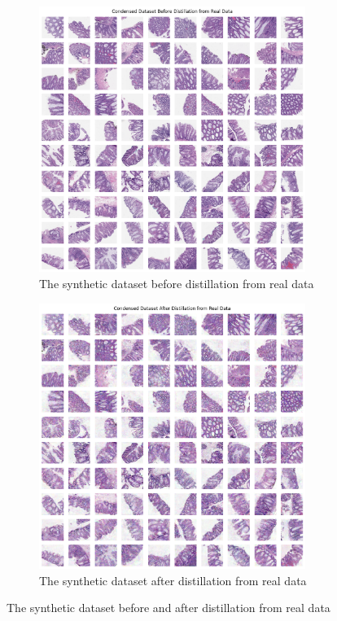 \documentclass[onecolumn]{IEEEtran}
\begin{document}
\begin{figure}[H]
    \centering
    \begin{subfigure}{.5\textwidth}
        \centering
        \includegraphics[width=0.95\textwidth]{images/MHIST_datadam_before_distil_real.png}
        \caption{The synthetic dataset before distillation from real data}
        \label{fig:MHIST_datadam_before_distil_real}
    \end{subfigure}%
    \begin{subfigure}{.5\textwidth}
        \centering
        \includegraphics[width=0.95\textwidth]{images/MHIST_datadam_after_distil_real.png}
        \caption{The synthetic dataset after distillation from real data}
        \label{fig:MHIST_datadam_after_distil_real}
    \end{subfigure}
    \caption{The synthetic dataset before and after distillation from real data}
\end{figure}
\end{document}
